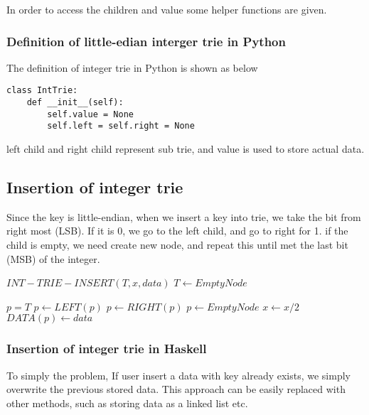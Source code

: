 \documentclass{article}
\begin{document}
In order to access the children and value some helper functions are given.

\subsubsection*{Definition of little-edian interger trie in Python}
The definition of integer trie in Python is shown as below

\lstset{language=Python}
\begin{lstlisting}
class IntTrie:
    def __init__(self):
        self.value = None
        self.left = self.right = None
\end{lstlisting}

left child and right child represent sub trie, and value is used to 
store actual data.

\subsection{Insertion of integer trie}
Since the key is little-endian, when we insert a key into trie, we take the
bit from right most (LSB). If it is 0, we go to the left child, and go to right
for 1. if the child is empty, we need create new node, and repeat this until
met the last bit (MSB) of the integer.

\begin{algorithmic}
\STATE $INT-TRIE-INSERT(T, x, data)$
   \STATE $T \leftarrow EmptyNode$ \ENDIF

  \STATE $p=T$
      \STATE $p \leftarrow LEFT(p)$
    \ELSE
      \STATE $p \leftarrow RIGHT(p)$
    \ENDIF
      \STATE $p \leftarrow EmptyNode$ \ENDIF
    \STATE $x \leftarrow x/2$
  \ENDWHILE
  \STATE $DATA(p) \leftarrow data$
\end{algorithmic}

\subsubsection*{Insertion of integer trie in Haskell}
To simply the problem, If user insert a data with key already exists, we simply
overwrite the previous stored data. This approach can be easily replaced with 
other methods, such as storing data as a linked list etc.
\end{document}
